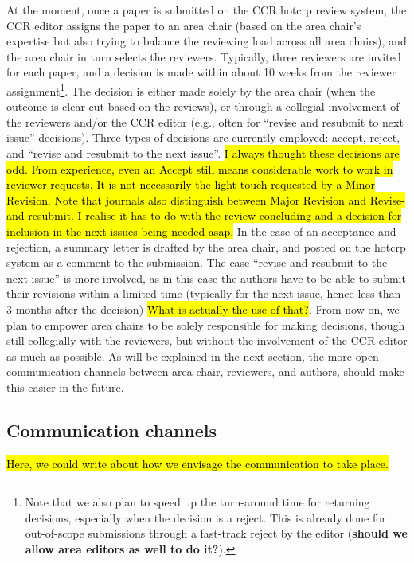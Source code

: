 \documentclass[letterpaper]{article}
\begin{document}
\begin{multicols}{2}
At the moment, once a paper is submitted on the CCR hotcrp review system,
the CCR editor assigns the paper to an area chair (based on the area
chair's expertise but also trying to balance the reviewing load across all
area chairs), and the area chair in turn selects the reviewers. Typically,
three reviewers are invited for each paper, and a decision is made within
about 10 weeks from the reviewer assignment\footnote{Note that we also plan
to speed up the turn-around time for returning decisions, especially when
the decision is a reject. This is already done for out-of-scope submissions
through a fast-track reject by the editor (\textbf{should we allow area
editors as well to do it?}).}. The decision is either made solely by the
area chair (when the outcome is clear-cut based on the reviews), or through
a collegial involvement of the reviewers and/or the CCR editor (e.g., often
for ``revise and resubmit to next issue'' decisions). Three types of
decisions are currently employed: accept, reject, and ``revise and resubmit
to the next issue''. \hl{I always thought these decisions are odd. From
experience, even an Accept still means considerable work to work in
reviewer requests. It is not necessarily the light touch requested by a
Minor Revision. Note that journals also distinguish between Major Revision
and Revise-and-resubmit. I realise it has to do with the review concluding
and a decision for inclusion in the next issues being needed asap.} In the
case of an acceptance and rejection, a summary letter is drafted by the
area chair, and posted on the hotcrp system as a comment to the submission.
The case ``revise and resubmit to the next issue'' is more involved, as in
this case the authors have to be able to submit their revisions within a
limited time (typically for the next issue, hence less than 3 months after
the decision) \hl{What is actually the use of that?}. From now on, we plan
to empower area chairs to be solely responsible for making decisions,
though still collegially with the reviewers, but without the involvement of
the CCR editor as much as possible. As will be explained in the next
section, the more open communication channels between area chair,
reviewers, and authors, should make this easier in the future.

\subsection{Communication channels}
\hl{Here, we could write about how we envisage the communication to take place.}



\end{multicols}
\end{document}
